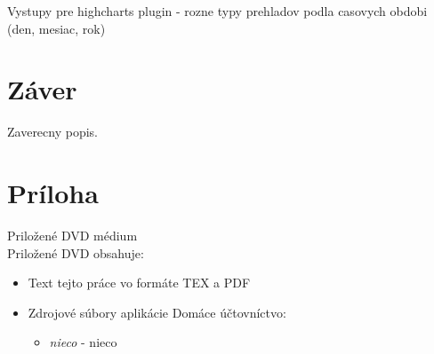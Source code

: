 \documentclass[12pt,onesided]{book}
\begin{document}
Vystupy pre highcharts plugin - rozne typy prehladov podla casovych obdobi (den, mesiac, rok)


\chapter{Záver}\label{chap:outro}
 
Zaverecny popis.

\backmatter

\nocite{*}




\newcommand{\dbappendix}[1]{\chapter{#1}}
\appendix
\dbappendix{Príloha}\label{appA}
{\large Priložené DVD médium}\\

Priložené DVD obsahuje:\\
\begin{itemize}
\item Text tejto práce vo formáte TEX a PDF
\item Zdrojové súbory aplikácie Domáce účtovníctvo:
	\begin{itemize}
		\item {\em nieco} - nieco
	\end{itemize}
\end{itemize}
\end{document}
